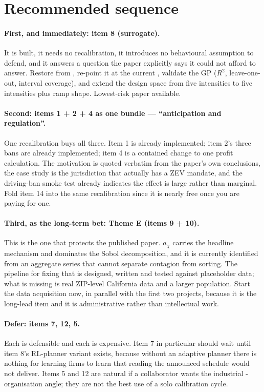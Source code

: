 \documentclass[11pt]{article}
\begin{document}
\section{Recommended sequence}

\paragraph{First, and immediately: item 8 (surrogate).}
It is built, it needs no recalibration, it introduces no behavioural
assumption to defend, and it answers a question the paper explicitly says it
could not afford to answer. Restore  from
, re-point it at the current
, validate the GP
($R^2$, leave-one-out, interval coverage), and extend the design space from
five intensities to five intensities plus ramp shape. Lowest-risk paper
available.

\paragraph{Second: items 1 + 2 + 4 as one bundle --- ``anticipation and
regulation''.}
One recalibration buys all three. Item 1 is already implemented; item 2's
three bans are already implemented; item 4 is a contained change to one
profit calculation. The motivation is quoted verbatim from the paper's own
conclusions, the case study is the jurisdiction that actually has a ZEV
mandate, and the driving-ban smoke test already indicates the effect is
large rather than marginal. Fold item 14 into the same recalibration since
it is nearly free once you are paying for one.

\paragraph{Third, as the long-term bet: Theme E (items 9 + 10).}
This is the one that protects the published paper. $a_\chi$ carries the
headline mechanism and dominates the Sobol decomposition, and it is
currently identified from an aggregate series that cannot separate contagion
from sorting. The pipeline for fixing that is designed, written and tested
against placeholder data; what is missing is real ZIP-level California data
and a larger population. Start the data acquisition now, in parallel with
the first two projects, because it is the long-lead item and it is
administrative rather than intellectual work.

\paragraph{Defer: items 7, 12, 5.} Each is defensible and each is
expensive. Item 7 in particular should wait until item 8's RL-planner
variant exists, because without an adaptive planner there is nothing for
learning firms to learn that reading the announced schedule would not
deliver. Items 5 and 12 are natural if a collaborator wants the industrial
-organisation angle; they are not the best use of a solo calibration cycle.
\end{document}
